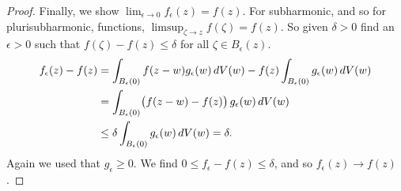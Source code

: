 \documentclass[12pt,openany]{book}
\newcommand{\avoidbreak}{\postdisplaypenalty=100}
\theoremstyle{plain}
\theoremstyle{remark}
\theoremstyle{definition}
\theoremstyle{exercise}
\theoremstyle{example}
\begin{document}
\begin{proof}
Finally, we show $\lim_{\epsilon \to 0} f_\epsilon (z) = f(z)$.
For subharmonic, and so for plurisubharmonic,
functions, $\limsup_{\zeta\to z} f(\zeta) = f(z)$.
So given $\delta >0$ find an $\epsilon >0$ such that
$f(\zeta)-f(z) \leq \delta$ for all $\zeta \in B_\epsilon(z)$.
\begin{equation*}
\begin{split}
f_\epsilon(z) - f(z)
& =
\int_{B_\epsilon(0)} f(z-w) g_\epsilon (w)
\, dV(w)
- f(z)
\int_{B_\epsilon(0)} g_\epsilon (w)
\, dV(w)
\\
& =
\int_{B_\epsilon(0)} \bigl(f(z-w)-f(z)\bigr)\, g_\epsilon (w)
\, dV(w)
\\
& \leq
\delta
\int_{B_\epsilon(0)} g_\epsilon (w)
\, dV(w)
= \delta .
\avoidbreak
\end{split}
\end{equation*}
Again we used that $g_\epsilon \geq 0$.
We find $0 \leq f_\epsilon - f(z) \leq \delta$, and so $f_\epsilon(z) \to
f(z)$.
\end{proof}
\end{document}
